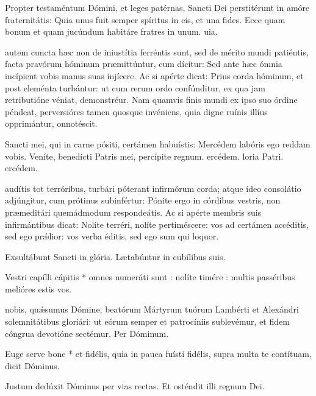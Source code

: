 \documentclass[fontsize=9pt,paper=A6,twoside,BCOR=1mm,DIV=22,headinclude]{scrarticle}
\begin{document}
\begin{multicols}{2}
{\R Propter testaméntum Dó\-mi\-ni, et leges patérnas, Sancti Dei perstitérunt in amóre fraternitátis:
\red{*} Quia unus fuit semper spíritus in eis, et una fides.
\V Ecce quam bonum et quam jucúndum habitáre fratres in unum. uia.

 autem cuncta hæc non de iniustítia ferréntis sunt, sed de mérito mundi patiéntis, facta pravórum hóminum præmittúntur, cum dícitur: Sed ante hæc ómnia incípient vobis manus suas injícere. Ac si apérte dicat: Prius corda hóminum, et post eleménta turbántur: ut cum rerum ordo confúnditur, ex qua jam retributióne véniat, demonstréur. Nam quamvis finis mundi ex ipso suo órdine péndeat, perversióres tamen quosque invéniens, quia digne ruínis illíus opprimántur, onnotéscit.

\R Sancti mei, qui in carne pósiti, certámen habuístis: \red{*} Mercédem labóris ego reddam vobis.
\V Veníte, benedícti Patris mei, percípite regnum.
ercédem. loria Patri. ercédem.


 audítis tot terróribus, turbári póterant infirmórum corda; atque ídeo consolátio adjúngitur, cum prótinus subinfértur: Pónite ergo in córdibus vestris, non præmeditári quemádmodum respondeátis. Ac si apérte membris suis infirmántibus dicat: Nolíte terréri, nolíte pertiméscere: vos ad certámen accéditis, sed ego pr\'ælior: vos verba éditis, sed ego sum qui loquor.

\Te


\V Exsultábunt Sancti in glória.
\R Lætabúntur in cubílibus suis.

 Vestri capílli cápitis * omnes numeráti sunt : nolíte timére : multis passéribus melióres estis vos.

 nobis, qu\'æsumus Dómine, beatórum Mártyrum tu\-ó\-rum Lambérti et Alexándri solemnitátibus gloriári: ut eórum semper et patrocíniis sublevémur, et fidem cóngrua devotióne sectémur. Per Dóminum.


\A Euge serve bone * et fidélis, quia in pauca fuísti fidélis, supra multa te contítuam, dicit Dóminus.

\V Justum dedúxit Dóminus per vias rectas.
\R Et osténdit illi regnum Dei.

}
\end{multicols}
\end{document}
